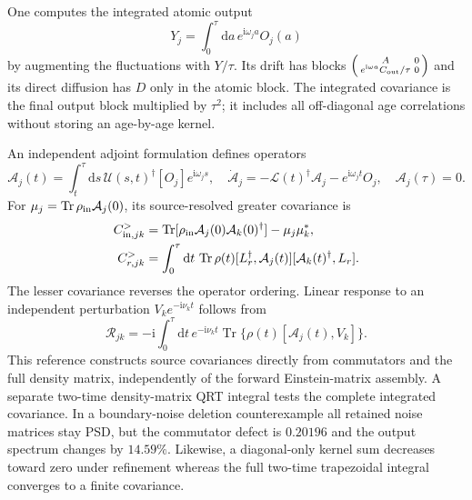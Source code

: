 \documentclass[11pt,a4paper]{article}
\newcommand{\dd}{\mathrm d}
\newcommand{\ii}{\mathrm i}
\newcommand{\e}{\mathrm e}
\newcommand{\Tr}{\operatorname{Tr}}
\begin{document}
One computes the integrated atomic output
\begin{equation}
 Y_j=\int_0^\tau\dd a\,e^{\ii\omega_j a}O_j(a)
 \label{eq:gc-integrated-output}
\end{equation}
by augmenting the fluctuations with $Y/\tau$. Its drift has blocks
$\left(\begin{smallmatrix}A&0\\e^{\ii\omega a}C_{\rm out}/\tau&0\end{smallmatrix}\right)$
and its direct diffusion has $D$ only in the atomic block. The integrated
covariance is the final output block multiplied by $\tau^2$; it includes all
off-diagonal age correlations without storing an age-by-age kernel.

An independent adjoint formulation defines operators
\begin{equation}
 \mathcal A_j(t)=\int_t^\tau\dd s\,
  \mathcal U(s,t)^\dagger[O_j]e^{\ii\omega_js},\quad
 \dot{\mathcal A}_j=-\mathcal L(t)^\dagger\mathcal A_j-e^{\ii\omega_jt}O_j,
 \quad\mathcal A_j(\tau)=0.
 \label{eq:gc-adjoint-output}
\end{equation}
For $\mu_j=\Tr\rho_{\rm in}\mathcal A_j(0)$, its source-resolved greater
covariance is
\begin{align}
 C_{{\rm in},jk}^>&=\Tr[\rho_{\rm in}\mathcal A_j(0)\mathcal A_k(0)^\dagger]-\mu_j\mu_k^*,
 \label{eq:gc-adjoint-boundary}\\
 C_{r,jk}^>&=\int_0^\tau\dd t\,
 \Tr\rho(t)[L_r^\dagger,\mathcal A_j(t)]
                   [\mathcal A_k(t)^\dagger,L_r].
 \label{eq:gc-adjoint-jumps}
\end{align}
The lesser covariance reverses the operator ordering. Linear response to an
independent perturbation $V_ke^{-\ii\nu_kt}$ follows from
\begin{equation}
 \mathcal R_{jk}=-\ii\int_0^\tau\dd t\,
 e^{-\ii\nu_kt}\Tr\{\rho(t)[\mathcal A_j(t),V_k]\}.
 \label{eq:gc-adjoint-response}
\end{equation}
This reference constructs source covariances directly from commutators and
the full density matrix, independently of the forward Einstein-matrix
assembly. A separate two-time density-matrix QRT integral tests the complete
integrated covariance. In a boundary-noise deletion counterexample all
retained noise matrices stay PSD, but the commutator defect is $0.20196$ and
the output spectrum changes by $14.59\%$. Likewise, a diagonal-only kernel
sum decreases toward zero under refinement whereas the full two-time
trapezoidal integral converges to a finite covariance.
\end{document}
